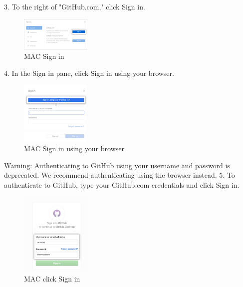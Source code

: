3.	To the right of "GitHub.com," click Sign in.
\begin{figure}[ht]
    \centering
    \includegraphics[width=0.3\textwidth]{figures/MAC Sign in.png}
    \caption{MAC Sign in}
\end{figure}


4.	In the Sign in pane, click Sign in using your browser. 

\begin{figure}[ht]
    \centering
    \includegraphics[width=0.3\textwidth]{figures/MAC Sign in using your browser.png}
    \caption{MAC Sign in using your browser}
\end{figure}

Warning: Authenticating to GitHub using your username and password is deprecated. We recommend authenticating using the browser instead.
5.	To authenticate to GitHub, type your GitHub.com credentials and click Sign in.

\begin{figure}[ht]
    \centering
    \includegraphics[width=0.3\textwidth]{figures/MAC click Sign in.png}
    \caption{MAC click Sign in}
\end{figure}

